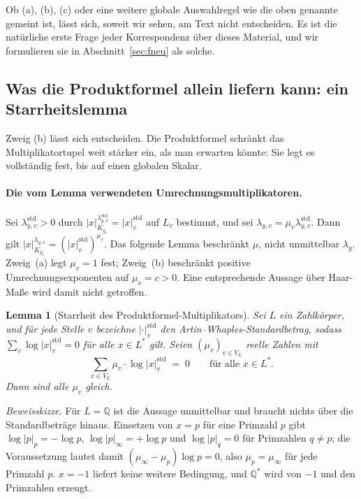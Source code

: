 \documentclass[11pt,a4paper]{article}
\theoremstyle{definition}
\theoremstyle{plain}
\newtheorem{lemmaR}{Lemma}
\theoremstyle{definition}
\begin{document}
Ob (a), (b), (c) oder eine weitere globale Auswahlregel wie die oben genannte
gemeint ist, lässt sich, soweit wir sehen, am Text nicht entscheiden. Es ist die
natürliche erste Frage jeder Korrespondenz über dieses Material, und wir
formulieren sie in Abschnitt~\ref{sec:fneu} als solche.

\subsection{Was die Produktformel allein liefern kann: ein Starrheitslemma}
\label{sec:rigidity}

Zweig (b) lässt sich entscheiden. Die Produktformel schränkt das Multiplikatortupel
weit stärker ein, als man erwarten könnte: Sie legt es vollständig fest, bis auf
einen globalen Skalar.

\paragraph{Die vom Lemma verwendeten Umrechnungsmultiplikatoren.}
Sei $\lambda^{\mathrm{std}}_{y,v}>0$ durch
$|x|_{K_{y_v}}^{\lambda^{\mathrm{std}}_{y,v}}=|x|^{\mathrm{std}}_v$ auf $L_v$
bestimmt, und sei $\lambda_{y,v}=\mu_v\lambda^{\mathrm{std}}_{y,v}$.
Dann gilt $|x|_{K_{y_v}}^{\lambda_{y,v}}=(|x|^{\mathrm{std}}_v)^{\mu_v}$.
Das folgende Lemma beschränkt $\mu$, nicht unmittelbar $\lambda_y$.
Zweig~(a) legt $\mu_v=1$ fest; Zweig~(b) beschränkt positive
Umrechnungsexponenten auf $\mu_v=c>0$. Eine entsprechende Aussage über
Haar-Maße wird damit nicht getroffen.

\begin{lemmaR}[Starrheit des Produktformel-Multiplikators]
\label{lem:rigidity}
Sei $L$ ein Zahlkörper, und für jede Stelle $v$ bezeichne
$|\cdot|^{\mathrm{std}}_v$ den Artin--Whaples-Standardbetrag, sodass
$\sum_v \log|x|^{\mathrm{std}}_v = 0$ für alle $x \in L^*$ gilt. Seien
$(\mu_v)_{v \in V_L}$ reelle Zahlen mit
\[
  \sum_{v \in V_L} \mu_v \cdot \log|x|^{\mathrm{std}}_v \;=\; 0
  \qquad \text{für alle } x \in L^*.
\]
Dann sind alle $\mu_v$ gleich.
\end{lemmaR}

\noindent\emph{Beweisskizze.}
Für $L = \mathbb{Q}$ ist die Aussage unmittelbar und braucht nichts über die
Standardbeträge hinaus. Einsetzen von $x = p$ für eine Primzahl $p$ gibt
$\log|p|_p = -\log p$, $\log|p|_\infty = +\log p$ und $\log|p|_q = 0$ für
Primzahlen $q \neq p$; die Voraussetzung lautet damit
$(\mu_\infty - \mu_p)\log p = 0$, also $\mu_p = \mu_\infty$ für jede Primzahl $p$.
$x = -1$ liefert keine weitere Bedingung, und $\mathbb{Q}^*$ wird von $-1$ und den
Primzahlen erzeugt.
\end{document}
